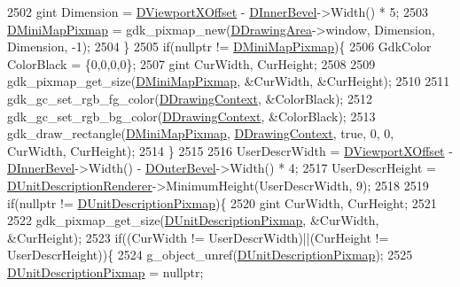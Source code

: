 \begin{DoxyCode}
{2502         gint Dimension = \hyperlink{classCApplicationData_a306bba873ccc47126111305fe21ef3ff}{DViewportXOffset} - \hyperlink{classCApplicationData_a29a687c44dceb9e87a56d96612d59ab5}{DInnerBevel}->Width() * 5;
2503         \hyperlink{classCApplicationData_abe3af81659ead5113b7b2f165a88e737}{DMiniMapPixmap} = gdk\_pixmap\_new(\hyperlink{classCApplicationData_a4735f5d31632313e0b2a1659eb178987}{DDrawingArea}->window, Dimension, 
      Dimension, -1);   
2504     \}
2505     \textcolor{keywordflow}{if}(\textcolor{keyword}{nullptr} != \hyperlink{classCApplicationData_abe3af81659ead5113b7b2f165a88e737}{DMiniMapPixmap})\{
2506         GdkColor ColorBlack = \{0,0,0,0\};
2507         gint CurWidth, CurHeight;
2508         
2509         gdk\_pixmap\_get\_size(\hyperlink{classCApplicationData_abe3af81659ead5113b7b2f165a88e737}{DMiniMapPixmap}, &CurWidth, &CurHeight);
2510 
2511         gdk\_gc\_set\_rgb\_fg\_color(\hyperlink{classCApplicationData_aa6c5bea9bdcc64398e5a3f693661d37c}{DDrawingContext}, &ColorBlack);
2512         gdk\_gc\_set\_rgb\_bg\_color(\hyperlink{classCApplicationData_aa6c5bea9bdcc64398e5a3f693661d37c}{DDrawingContext}, &ColorBlack);
2513         gdk\_draw\_rectangle(\hyperlink{classCApplicationData_abe3af81659ead5113b7b2f165a88e737}{DMiniMapPixmap}, \hyperlink{classCApplicationData_aa6c5bea9bdcc64398e5a3f693661d37c}{DDrawingContext}, \textcolor{keyword}{true}, 0, 0, 
      CurWidth, CurHeight);
2514     \}
2515     
2516     UserDescrWidth = \hyperlink{classCApplicationData_a306bba873ccc47126111305fe21ef3ff}{DViewportXOffset} - \hyperlink{classCApplicationData_a29a687c44dceb9e87a56d96612d59ab5}{DInnerBevel}->Width() - 
      \hyperlink{classCApplicationData_abc2b04aa05148da81145ff6d6bc2bf01}{DOuterBevel}->Width() * 4;
2517     UserDescrHeight = \hyperlink{classCApplicationData_a194301f34566fc497b032bdfcad55287}{DUnitDescriptionRenderer}->MinimumHeight(UserDescrWidth, 9);
2518     
2519     \textcolor{keywordflow}{if}(\textcolor{keyword}{nullptr} != \hyperlink{classCApplicationData_a52e5c1a2ac452c82580ba3f4978c3501}{DUnitDescriptionPixmap})\{
2520         gint CurWidth, CurHeight;
2521         
2522         gdk\_pixmap\_get\_size(\hyperlink{classCApplicationData_a52e5c1a2ac452c82580ba3f4978c3501}{DUnitDescriptionPixmap}, &CurWidth, &CurHeight);
2523         \textcolor{keywordflow}{if}((CurWidth != UserDescrWidth)||(CurHeight != UserDescrHeight))\{
2524             g\_object\_unref(\hyperlink{classCApplicationData_a52e5c1a2ac452c82580ba3f4978c3501}{DUnitDescriptionPixmap});
2525             \hyperlink{classCApplicationData_a52e5c1a2ac452c82580ba3f4978c3501}{DUnitDescriptionPixmap} = \textcolor{keyword}{nullptr};
}
\end{DoxyCode}
